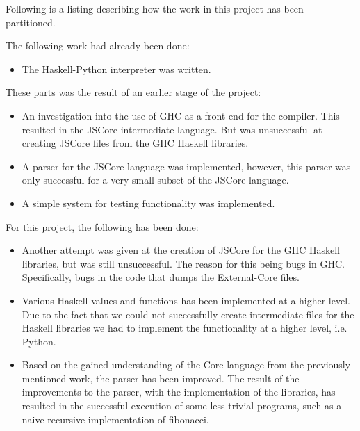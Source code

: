 Following is a listing describing how the work in this project has been
partitioned.

The following work had already been done:
\begin{itemize}

\item The Haskell-Python\cite{haskellpython} interpreter was written.

\end{itemize}

These parts was the result of an earlier stage of the project:
\begin{itemize}

\item An investigation into the use of GHC as a front-end for the compiler.
This resulted in the JSCore intermediate language. But was unsuccessful
at creating JSCore files from the GHC Haskell libraries.

\item A parser for the JSCore language was implemented, however, this 
parser was only successful for a very small subset of the JSCore language.

\item A simple system for testing functionality was implemented.

\end{itemize}

For this project, the following has been done:
\begin{itemize}

\item Another attempt was given at the creation of JSCore for the GHC 
Haskell libraries, but was still unsuccessful. The reason for this being
bugs in GHC. Specifically, bugs in the code that dumps the External-Core
files.

\item Various Haskell values and functions has been implemented at a higher
level. Due to the fact that we could not successfully create intermediate
files for the Haskell
libraries we had to implement the functionality at a higher level, i.e. 
Python.

\item Based on the gained understanding of the Core language from the
previously mentioned work, the parser has been improved. The result of 
the improvements to the parser, with the implementation of the libraries,
has resulted in the successful execution of some less trivial programs,
such as a naive recursive implementation of fibonacci.

\end{itemize}

